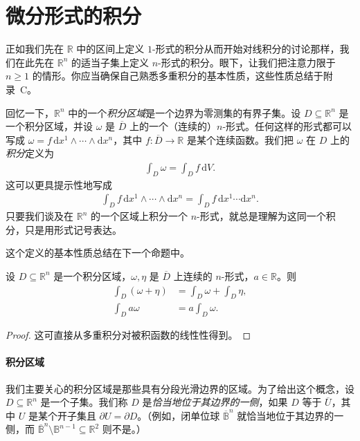 \documentclass[../../main.tex]{subfiles}
\begin{document}
\section{微分形式的积分}\label{section:ch16-integration-of-differential-forms}

正如我们先在 $\mathbb{R}$ 中的区间上定义 $1$-形式的积分从而开始对线积分的讨论那样，我们在此先在 $\mathbb{R}^n$ 的适当子集上定义 $n$-形式的积分。眼下，让我们把注意力限于 $n\geqslant1$ 的情形。你应当确保自己熟悉多重积分的基本性质，这些性质总结于附录~C。

回忆一下，$\mathbb{R}^n$ 中的一个\emph{积分区域}是一个边界为零测集的有界子集。设 $D\subseteq\mathbb{R}^n$ 是一个积分区域，并设 $\omega$ 是 $\overline{D}$ 上的一个（连续的）$n$-形式。任何这样的形式都可以写成 $\omega=f\,\mathrm{d}x^1\wedge\cdots\wedge\mathrm{d}x^n$，其中 $f:\overline{D}\to\mathbb{R}$ 是某个连续函数。我们把 $\omega$ 在 $D$ 上的\emph{积分}定义为
\begin{align*}
\int_D\omega=\int_D f\,\mathrm{d}V.
\end{align*}
这可以更具提示性地写成
\begin{align*}
\int_D f\,\mathrm{d}x^1\wedge\cdots\wedge\mathrm{d}x^n=\int_D f\,\mathrm{d}x^1\cdots\mathrm{d}x^n.
\end{align*}
只要我们谈及在 $\mathbb{R}^n$ 的一个区域上积分一个 $n$-形式，就总是理解为这同一个积分，只是用形式记号表达。

这个定义的基本性质总结在下一个命题中。

\begin{proposition}[积分的线性]\label{proposition:ch16-linearity-of-integration}
设 $D\subseteq\mathbb{R}^n$ 是一个积分区域，$\omega,\eta$ 是 $\overline{D}$ 上连续的 $n$-形式，$a\in\mathbb{R}$。则
\begin{align*}
\int_D(\omega+\eta)&=\int_D\omega+\int_D\eta,\\
\int_D a\omega&=a\int_D\omega.
\end{align*}
\end{proposition}

\begin{proof}这可直接从多重积分对被积函数的线性性得到。
\end{proof}

\paragraph{积分区域}
我们主要关心的积分区域是那些具有分段光滑边界的区域。为了给出这个概念，设 $D\subseteq\mathbb{R}^n$ 是一个子集。我们称 $D$ 是\emph{恰当地位于其边界的一侧}，如果 $D$ 等于 $\overline{U}$，其中 $U$ 是某个开子集且 $\partial U=\partial D$。（例如，闭单位球 $\overline{\mathbb{B}}^n$ 就恰当地位于其边界的一侧，而 $\overline{\mathbb{B}}^n\setminus\mathbb{B}^{n-1}\subseteq\mathbb{R}^2$ 则不是。）
\end{document}
